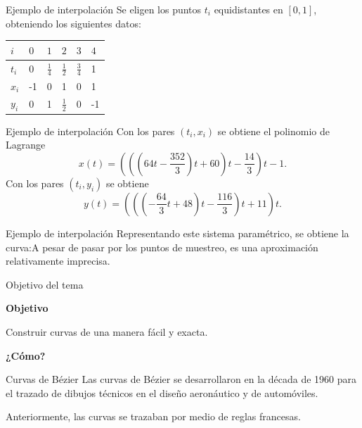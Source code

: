 \documentclass[original_version/main.tex]{subfiles}
\begin{document}
\begin{frame}[t]{Ejemplo de interpolación}
Se eligen los puntos $t_i$ equidistantes en $[0,1]$, obteniendo los siguientes datos:\begingroup\small\setlength{\tabcolsep}{2pt}\begin{center}\begin{tabular}{|C{.14\textwidth}|C{.14\textwidth}|C{.14\textwidth}|C{.14\textwidth}|C{.14\textwidth}|C{.14\textwidth}|}\hline
$i$ & $0$ & $1$ & $2$ & $3$ & $4$\\\hline
\rule[-1.5mm]{0pt}{5mm}$t_i$ & 0 & $\frac14$ & $\frac12$ & $\frac34$ & 1\\\hline
\rule[-1.5mm]{0pt}{5mm}$x_i$ & -1 & 0 & 1 & 0 & 1\\\hline
\rule[-1.5mm]{0pt}{5mm}$y_i$ & 0 & 1 & $\frac12$ & 0 & -1\\\hline
\end{tabular}\end{center}\endgroup{}
\end{frame}

\begin{frame}[t]{Ejemplo de interpolación}
Con los pares $(t_i,x_i)$ se obtiene el polinomio de Lagrange\[x(t)=\left(\left(\left(64t-\frac{352}{3}\right)t+60\right)t-\frac{14}{3}\right)t-1.\]\medskip Con los pares $(t_i,y_i)$ se obtiene\[y(t)=\left(\left(\left(-\frac{64}{3}t+48\right)t-\frac{116}{3}\right)t+11\right)t.\]
\end{frame}

\begin{frame}[t]{Ejemplo de interpolación}
Representando este sistema paramétrico, se obtiene la curva:A pesar de pasar por los puntos de muestreo, es una aproximación relativamente imprecisa.
\end{frame}

\begin{frame}[t]{Objetivo del tema}
\vfill\begin{center}\Large\textbf{Objetivo}\par\bigskip Construir curvas de una manera fácil y exacta.\par\bigskip\textbf{¿Cómo?}\end{center}\vfill
\end{frame}

\begin{frame}[t]{Curvas de Bézier}
Las curvas de Bézier se desarrollaron en la década de 1960 para el trazado de dibujos técnicos en el diseño aeronáutico y de automóviles.\par\medskip Anteriormente, las curvas se trazaban por medio de reglas francesas.
\end{frame}
\end{document}
